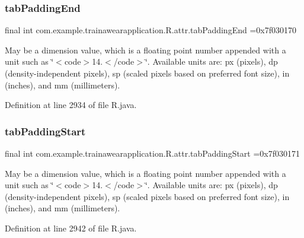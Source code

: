 \subsubsection{\texorpdfstring{tabPaddingEnd}{tabPaddingEnd}}
{\footnotesize\ttfamily final int com.\+example.\+trainawearapplication.\+R.\+attr.\+tab\+Padding\+End =0x7f030170\hspace{0.3cm}{\ttfamily [static]}}

May be a dimension value, which is a floating point number appended with a unit such as \char`\"{}$<$code$>$14.\+5sp$<$/code$>$\char`\"{}. Available units are\+: px (pixels), dp (density-\/independent pixels), sp (scaled pixels based on preferred font size), in (inches), and mm (millimeters). 

Definition at line 2934 of file R.\+java.

\mbox{\label{classcom_1_1example_1_1trainawearapplication_1_1_r_1_1attr_afba258ee57f4c1de5a01ad540f1713e0}} 
\subsubsection{\texorpdfstring{tabPaddingStart}{tabPaddingStart}}
{\footnotesize\ttfamily final int com.\+example.\+trainawearapplication.\+R.\+attr.\+tab\+Padding\+Start =0x7f030171\hspace{0.3cm}{\ttfamily [static]}}

May be a dimension value, which is a floating point number appended with a unit such as \char`\"{}$<$code$>$14.\+5sp$<$/code$>$\char`\"{}. Available units are\+: px (pixels), dp (density-\/independent pixels), sp (scaled pixels based on preferred font size), in (inches), and mm (millimeters). 

Definition at line 2942 of file R.\+java.

\mbox{\label{classcom_1_1example_1_1trainawearapplication_1_1_r_1_1attr_a6ab259800ce809ed57002b08ff33214c}} 
